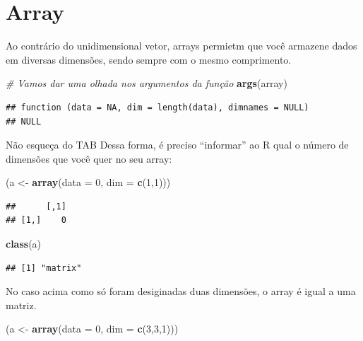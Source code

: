 \documentclass[]{book}
\newenvironment{Shaded}{\begin{snugshade}}{\end{snugshade}}
\newcommand{\KeywordTok}[1]{\textcolor[rgb]{0.13,0.29,0.53}{\textbf{#1}}}
\newcommand{\DataTypeTok}[1]{\textcolor[rgb]{0.13,0.29,0.53}{#1}}
\newcommand{\DecValTok}[1]{\textcolor[rgb]{0.00,0.00,0.81}{#1}}
\newcommand{\StringTok}[1]{\textcolor[rgb]{0.31,0.60,0.02}{#1}}
\newcommand{\CommentTok}[1]{\textcolor[rgb]{0.56,0.35,0.01}{\textit{#1}}}
\newcommand{\NormalTok}[1]{#1}
\theoremstyle{definition}
\theoremstyle{definition}
\theoremstyle{definition}
\theoremstyle{remark}
\begin{document}
\section{Array}\label{array}

Ao contrário do unidimensional vetor, arrays permietm que você armazene
dados em diversas dimensões, sendo sempre com o mesmo comprimento.

\begin{Shaded}
\begin{Highlighting}[]
\CommentTok{# Vamos dar uma olhada nos argumentos da função}
\KeywordTok{args}\NormalTok{(array)}
\end{Highlighting}
\end{Shaded}

\begin{verbatim}
## function (data = NA, dim = length(data), dimnames = NULL) 
## NULL
\end{verbatim}

Não esqueça do TAB Dessa forma, é preciso ``informar'' ao R qual o
número de dimensões que você quer no seu array:

\begin{Shaded}
\begin{Highlighting}[]
\NormalTok{(a <-}\StringTok{ }\KeywordTok{array}\NormalTok{(}\DataTypeTok{data =} \DecValTok{0}\NormalTok{, }\DataTypeTok{dim =} \KeywordTok{c}\NormalTok{(}\DecValTok{1}\NormalTok{,}\DecValTok{1}\NormalTok{)))}
\end{Highlighting}
\end{Shaded}

\begin{verbatim}
##      [,1]
## [1,]    0
\end{verbatim}

\begin{Shaded}
\begin{Highlighting}[]
\KeywordTok{class}\NormalTok{(a)}
\end{Highlighting}
\end{Shaded}

\begin{verbatim}
## [1] "matrix"
\end{verbatim}

No caso acima como só foram desiginadas duas dimensões, o array é igual
a uma matriz.

\begin{Shaded}
\begin{Highlighting}[]
\NormalTok{(a <-}\StringTok{ }\KeywordTok{array}\NormalTok{(}\DataTypeTok{data =} \DecValTok{0}\NormalTok{, }\DataTypeTok{dim =} \KeywordTok{c}\NormalTok{(}\DecValTok{3}\NormalTok{,}\DecValTok{3}\NormalTok{,}\DecValTok{1}\NormalTok{)))}
\end{Highlighting}
\end{Shaded}
\end{document}
